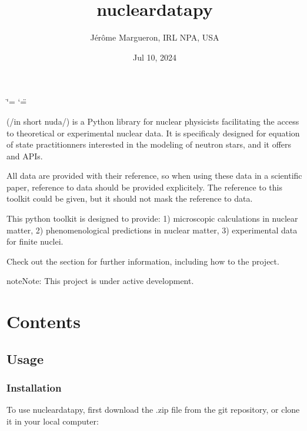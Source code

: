 \documentclass[letterpaper,10pt,english]{sphinxmanual}
\title{nucleardatapy}
\date{Jul 10, 2024}
\author{Jérôme Margueron, IRL NPA, USA}
\begin{document}
\ifdefined\shorthandoff
  \ifnum\catcode`\=\string=\active\shorthandoff{=}\fi
  \ifnum\catcode`\"=\active{}\fi
\fi

\pagestyle{empty}
\sphinxmaketitle
\pagestyle{plain}
\sphinxtableofcontents
\pagestyle{normal}
\label{\detokenize{index::doc}}


\sphinxAtStartPar
{} (/in short nuda/) is a Python library for nuclear physicists facilitating the access to theoretical or experimental nuclear data. It is specificaly designed for equation of state practitionners interested in the modeling of neutron stars, and it offers  and  APIs.

\sphinxAtStartPar
All data are provided with their reference, so when using these data in a scientific paper, reference to data should be provided explicitely. The reference to this toolkit could be given, but it should not mask the reference to data.

\sphinxAtStartPar
This python toolkit is designed to provide:
1) microscopic calculations in nuclear matter,
2) phenomenological predictions in nuclear matter,
3) experimental data for finite nuclei.

\sphinxAtStartPar
Check out the {\hyperref[\detokenize{source/usage::doc}]{}} section for further information, including how to
{\hyperref[\detokenize{source/usage:installation}]{}} the project.

\begin{sphinxadmonition}{note}{Note:}
\sphinxAtStartPar
This project is under active development.
\end{sphinxadmonition}


\chapter{Contents}
\label{\detokenize{index:contents}}
\sphinxstepscope


\section{Usage}
\label{\detokenize{source/usage:usage}}\label{\detokenize{source/usage::doc}}

\subsection{Installation}
\label{\detokenize{source/usage:installation}}\label{\detokenize{source/usage:id1}}
\sphinxAtStartPar
To use nucleardatapy, first download the .zip file from the git repository, or clone it in your local computer:
\end{document}
